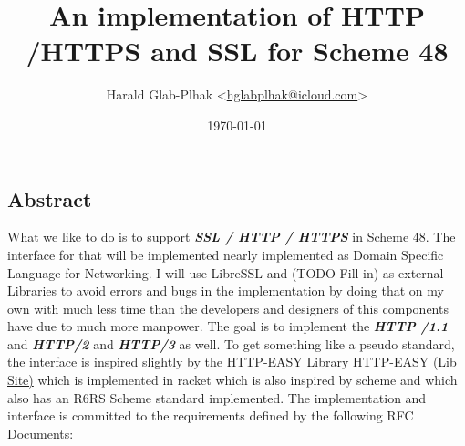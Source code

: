 \documentclass[10pt,a4paper,english]{article}
\title{An implementation of HTTP /HTTPS and SSL for Scheme 48 }
\author{Harald Glab-Plhak {\textless}\href{mailto:hglabplhak@icloud.com}{hglabplhak@icloud.com}{\textgreater}}
\date{\today{}}
\newcommand{\abbrhighcol}[1]{\textbf{\textit{#1}}}
\begin{document}



\maketitle
\tableofcontents

\begin{multicols}{2}
\section{Abstract}

\begin{flushleft}
What we like to do is to support \abbrhighcol{SSL / HTTP  / HTTPS} in Scheme 48. The interface for that will be implemented nearly implemented as Domain Specific Language for Networking. I will use LibreSSL and (TODO Fill in) as external Libraries to avoid errors and bugs in the implementation by doing that on my own with much less time than the developers and designers of this components have due to much more manpower.  
The goal is to implement the \abbrhighcol{HTTP /1.1} and \abbrhighcol{HTTP/2} and \abbrhighcol{HTTP/3} as well. To get something  like a pseudo standard,  the interface is inspired slightly by the HTTP-EASY Library
\href{https://pkgs.racket-lang.org/package/http-easy-lib}{HTTP-EASY (Lib Site)}  which is implemented in racket which is also inspired by scheme and which also has an R6RS Scheme standard implemented. 
The implementation and interface is committed to the requirements defined by the following RFC Documents:
\end{flushleft}


\end{multicols}
\end{document}
